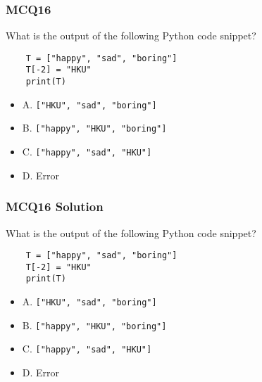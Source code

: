 \documentclass{beamer}
\begin{document}
\begin{frame}[fragile]
    \frametitle{MCQ16}
    What is the output of the following Python code snippet?
    \begin{verbatim}
    T = ["happy", "sad", "boring"]
    T[-2] = "HKU"
    print(T)
    \end{verbatim}
    \begin{itemize}
        \item A. \texttt{["HKU", "sad", "boring"]}
        \item B. \texttt{["happy", "HKU", "boring"]}
        \item C. \texttt{["happy", "sad", "HKU"]}
        \item D. Error
    \end{itemize}
\end{frame}
\begin{frame}[fragile]
    \frametitle{MCQ16 Solution}
    What is the output of the following Python code snippet?
    \begin{verbatim}
    T = ["happy", "sad", "boring"]
    T[-2] = "HKU"
    print(T)
    \end{verbatim}
    \begin{itemize}
        \item A. \texttt{["HKU", "sad", "boring"]}
        \item \alert{B. \texttt{["happy", "HKU", "boring"]}}
        \item C. \texttt{["happy", "sad", "HKU"]}
        \item D. Error
    \end{itemize}
\end{frame}
\end{document}
